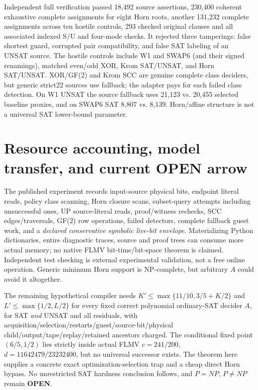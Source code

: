 \documentclass[11pt]{article}
\begin{document}
Independent full verification passed 18,492 source assertions, 230,400 coherent exhaustive complete assignments for eight Horn roots, another 131,232 complete assignments across ten hostile controls, 293 checked original clauses and all associated indexed S/U and four-mode checks. It rejected three tamperings: false shortest guard, corrupted pair compatibility, and false SAT labeling of an UNSAT source. The hostile controls include W1 and SWAP6 (and their signed renamings), matched even/odd XOR, Krom SAT/UNSAT, and Horn SAT/UNSAT. XOR/GF(2) and Krom SCC are genuine complete class deciders, but generic strict22 sources use fallback; the adapter pays for each failed class detection. On W1 UNSAT the source fallback uses 21,123 vs. 20,455 selected baseline proxies, and on SWAP6 SAT 8,807 vs. 8,139. Horn/affine structure is not a universal SAT lower-bound parameter.

\section{Resource accounting, model transfer, and current OPEN arrow}
The published experiment records input-source physical bits, endpoint literal reads, policy class scanning, Horn closure scans, subset-query attempts including unsuccessful ones, UP source-literal reads, proof/witness rechecks, SCC edges/traversals, GF(2) row operations, failed detectors, complete fallback guest work, and a \emph{declared conservative symbolic live-bit envelope}. Materializing Python dictionaries, entire diagnostic traces, source and proof trees can consume more actual memory; no native FLMV bit-time/bit-space theorem is claimed. Independent test checking is external experimental validation, not a free online operation. Generic minimum Horn support is NP-complete, but arbitrary $A$ could avoid it altogether.

The remaining hypothetical compiler needs $K'\le\max\{11/10,3/5+K/2\}$ and $L'\le\max\{1/2,L/2\}$ for every fixed correct polynomial ordinary-SAT decider $A$, for SAT \emph{and} UNSAT and all residuals, with acquisition/selection/restarts/guest/source-bit/physical child/output/tape/replay/retained ancestors charged. The conditional fixed point $(6/5,1/2)$ lies strictly inside actual FLMV $c=241/200$, $d=11642479/23232400$, but no universal successor exists. The theorem here supplies a concrete exact optimization-selection trap and a cheap direct Horn bypass. No unrestricted SAT hardness conclusion follows, and $P=NP$, $P\ne NP$ remain \textbf{OPEN}.
\end{document}
